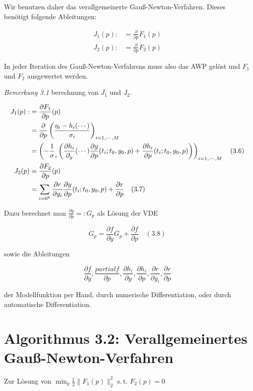 Wir benutzen daher das verallgemeinerte Gauß-Newton-Verfahren. Dieses benötigt folgende Ableitungen:

\begin{align*}
J_1(p) :&= \frac \partial{\partial p} F_1(p) \\
J_2(p) :&= \frac \partial{\partial p} F_2(p)
\end{align*}

In jeder Iteration des Gauß-Newton-Verfahrens muss also das AWP gelöst und $F_1$ und $F_2$ ausgewertet werden.

\emph{Bemerkung 3.1} berechnung von $J_1$ und $J_2$.

\begin{align*}
J_1(p) :&= \frac{\partial F_1}{\partial p} (p) \\
&= \frac{\partial}{\partial p} \left( \frac{\eta_i - h_i(\cdots)}{\sigma_i} \right)_{i=1,\cdots,M} \\
&= \left( -\frac 1 \sigma_i \left( \frac{\partial h_i}{\partial_y} (\cdots) \frac{\partial y}{\partial p}(t_i; t_0, y_0, p) + \frac{\partial h_i}{\partial p} (t_i; t_0, y_0, p) \right) \right)_{i=1,\cdots,M} \quad (3.6)\\
J_2(p) &= \frac{\partial F_2}{\partial p} (p) \\
&= \sum_{i=0^k} \frac{\partial r}{\partial y_i} \frac{\partial y}{\partial p} (t_i; t_0, y_0, p) + \frac{\partial r}{\partial p} \quad (3.7)
\end{align*}

Dazu berechnet man $\tfrac{\partial y}{\partial p} =: G_p$ als Lösung der VDE

\[ \dot G_p = \frac{\partial f}{\partial y} G_p + \frac{\partial f}{\partial p} \quad (3.8)\]

sowie die Ableitungen

\[ \frac{\partial f}{\partial y}, \frac{partial f}{\partial p}, \frac{\partial h_i}{\partial y}, \frac{\partial h_i}{\partial p}, \frac{\partial r}{\partial y_i}, \frac{\partial r}{\partial p}\]

der Modellfunktion per Hand, durch numerische Differentiation, oder durch automatische Differentiation.

\section*{Algorithmus 3.2: Verallgemeinertes Gauß-Newton-Verfahren}

Zur Lösung von $\min_p \tfrac 12 \|F_1(p)\|_2^2$ s.\,t. $F_2(p) = 0$

